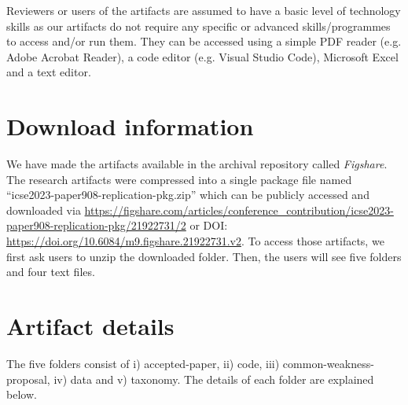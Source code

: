 \documentclass{article}
\begin{document}
Reviewers or users of the artifacts are assumed to have a basic level of technology skills as our artifacts do not require any specific or advanced skills/programmes to access and/or run them. They can be accessed using a simple PDF reader (e.g. Adobe Acrobat Reader), a code editor (e.g. Visual Studio Code), Microsoft Excel and a text editor.

\section{Download information}

We have made the artifacts available in the archival repository called \emph{Figshare}. The research artifacts were compressed into a single package file named ``icse2023-paper908-replication-pkg.zip'' which can be publicly accessed and downloaded via \url{https://figshare.com/articles/conference_contribution/icse2023-paper908-replication-pkg/21922731/2} or DOI: \url{https://doi.org/10.6084/m9.figshare.21922731.v2}. To access those artifacts, we first ask users to unzip the downloaded folder. Then, the users will see five folders and four text files.

\section{Artifact details}

The five folders consist of i) accepted-paper, ii) code, iii) common-weakness-proposal, iv) data and v) taxonomy. The details of each folder are explained below. 
\end{document}
